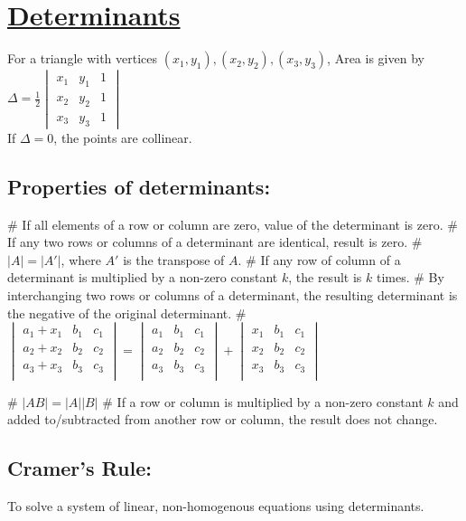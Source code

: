 \documentclass[Math.tex]{subfiles}
\begin{document}
\section*{\huge\centering\underline{Determinants}}
For a triangle with vertices $(x_1, y_1), (x_2, y_2), (x_3, y_3)$, Area is given by
$\Delta = \frac{1}{2}
\begin{vmatrix}
x_1 & y_1 & 1\\
x_2 & y_2 & 1\\
x_3 & y_3 & 1
\end{vmatrix}$\\
If $\Delta = 0$, the points are collinear.
\subsection*{Properties of determinants:}
\begin{easylist}
	# If all elements of a row or column are zero, value of the determinant is zero.
	# If any two rows or columns of a determinant are identical, result is zero.
	# $|A| = |A'|$, where $A'$ is the transpose of $A$.
	# If any row of column of a determinant is multiplied by a non-zero constant $k$, the result is $k$ times.
	# By interchanging two rows or columns of a determinant, the resulting determinant is the negative of the original determinant.
	# 	$\begin{vmatrix}
			a_1 + x_1 & b_1 & c_1\\
			a_2 + x_2 & b_2 & c_2\\
			a_3 + x_3 & b_3 & c_3\\
		\end{vmatrix} = 
		\begin{vmatrix}
			a_1 & b_1 & c_1\\
			a_2 & b_2 & c_2\\
			a_3 & b_3 & c_3\\
		\end{vmatrix} + 
		\begin{vmatrix}
			x_1 & b_1 & c_1\\
			x_2 & b_2 & c_2\\
			x_3 & b_3 & c_3\\
		\end{vmatrix}$
		
	# $|AB| = |A||B|$
	# If a row or column is multiplied by a non-zero constant $k$ and added to/subtracted from another row or column, the result does not change.	
\end{easylist}

\subsection*{Cramer's Rule:}
To solve a system of linear, non-homogenous equations using determinants.
\end{document}
